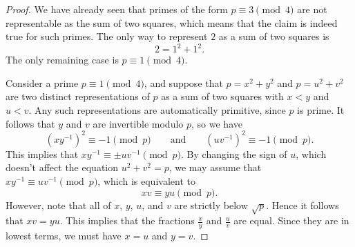 \begin{proof}
  We have already seen that primes of the form $p\equiv 3\pmod{4}$ are not representable as the sum of two squares, which means that the claim is indeed true for such primes. The only way to represent $2$ as a sum of two squares is
  \begin{equation*}
    2=1^2+1^2.
  \end{equation*}
  The only remaining case is $p\equiv 1\pmod{4}$.

  Consider a prime $p\equiv 1\pmod{4}$, and suppose that $p=x^2+y^2$ and $p=u^2+v^2$ are two distinct representations of $p$ as a sum of two squares with $x<y$ and $u<v$. Any such representations are automatically primitive, since $p$ is prime. It follows that $y$ and $v$ are invertible modulo $p$, so we have
  \begin{equation*}
    (xy^{-1})^2\equiv -1\pmod{p}\qquad\text{and}\qquad (uv^{-1})^2\equiv -1\pmod{p}.
  \end{equation*}
  This implies that $xy^{-1}\equiv \pm uv^{-1}\pmod{p}$. By changing the sign of $u$, which doesn't affect the equation $u^2+v^2=p$, we may assume that $xy^{-1}\equiv uv^{-1}\pmod{p}$, which is equivalent to
  \begin{equation*}
    xv\equiv yu\pmod{p}.
  \end{equation*}
  However, note that all of $x$, $y$, $u$, and $v$ are strictly below $\sqrt{p}$. Hence it follows that $xv= yu$. This implies that the fractions $\frac{x}{y}$ and $\frac{u}{v}$ are equal. Since they are in lowest terms, we must have $x=u$ and $y=v$.
\end{proof}

